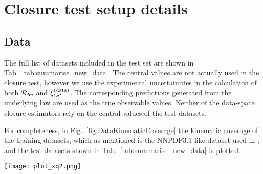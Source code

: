 \section{Closure test setup details}
\label{sec:appendix-datasets}

\subsection{Data}

The full list of datasets included in the test set are shown in
Tab.~\ref{tab:summarise_new_data}. The central values are not actually used
in the closure test, however we use the experimental uncertainities in
the calculation of both $\mathcal{R}_{bv}$ and $\xi^{(\rm data)}_{1 {{\sigma}^{\prime}}}$. The corresponding
predictions generated from the underlying law are used as the true
observable values. Neither of the data-space closure estimators rely on
the central values of the test datasets.

\begin{table}[h!]
    \begin{center}
        
    \end{center}
    \caption{
        Observables included in the test data. We wish to stress that the observable
        central values themselves are not used, however the experimental
        uncertainties are used in the definition of the closure estimators, and
        the corresponding predictions from either the underlying law or the
        closure fits.
    }
    \label{tab:summarise_new_data}
\end{table}

For completeness, in Fig.~\ref{fig:DataKinematicCoverage}
the kinematic coverage of the training datasets, which
as mentioned is the NNPDF3.1-like dataset used in \cite{Faura_2020}, and the
test datasets shown in Tab.~\ref{tab:summarise_new_data} is plotted.

\begin{figure*}
    \centering
    \texttt{[image: plot\_xq2.png]}
    \caption{The kinematic coverage of the training and test data
    used to train the models and produce results presented in this paper. 
    The kinematics of the two
    sets of data with this particular split overlaps but there are also kinematic
    regions which the test dataset probes, for which there are no training data.}
    \label{fig:DataKinematicCoverage}
\end{figure*}

